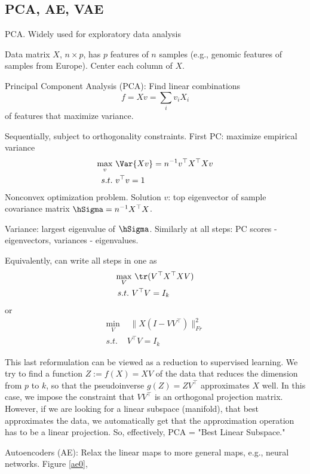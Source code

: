 \documentclass[english]{article}
\begin{document}
\eenum 

\subsection{PCA, AE, VAE}


\benum
\item PCA. Widely used for exploratory data analysis


Data matrix $X$, $n \times p$, has $p$ features of $n$ samples (e.g., genomic features of samples from Europe). Center each column of $X$.

Principal Component Analysis (PCA): Find linear combinations 
$$f = Xv = \sum_i v_i X_i$$ 
of features that maximize variance. 


Sequentially, subject to orthogonality constraints. First PC: maximize empirical variance 
\begin{align*}
\max_v\,\,  &\Var{Xv} = n^{-1} v^\top X^\top Xv\\
s.t.\,\,&v^\top v=1
\end{align*}
Nonconvex optimization problem. Solution $v$: top eigenvector of sample covariance matrix $\hSigma = n^{-1} X^\top X$.

Variance: largest eigenvalue of $\hSigma$. 
Similarly at all steps: PC scores - eigenvectors, variances - eigenvalues. 

Equivalently, can write all steps in one as 
\begin{align*}
\max_V&\,\, \tr (V^\top X^\top XV)\\
s.t.\,\,&V^\top V=I_k
\end{align*}
or 
\begin{align*}
\min_V&\,\,\|X(I-VV^\top)\|_{Fr}^2\\
s.t.\,\,&V^\top V=I_k
\end{align*}

This last reformulation can be viewed as a reduction to supervised learning. We try to find a function $Z:=f(X)=XV$ of the data that reduces the dimension from $p$ to $k$, so that the pseudoinverse $g(Z) = ZV^\top$ approximates $X$ well. In this case, we impose the constraint that $VV^\top$ is an orthogonal projection matrix. However, if we are looking for a linear subspace (manifold), that best approximates the data, we automatically get that the approximation operation has to be a linear projection. So, effectively, PCA = "Best Linear Subspace."


\item Autoencoders (AE): Relax the linear maps to more general maps, e.g., neural networks.  Figure \ref{ae0},
\end{document}
